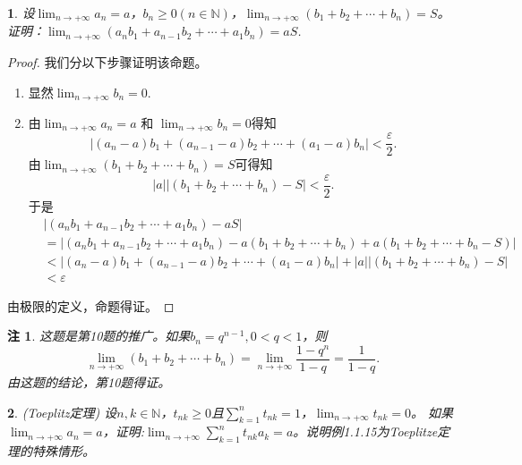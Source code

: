 \documentclass[utf8]{book}
\newtheorem{example}{}[section]             %
\newtheorem{remark}{注}
\begin{document}
\begin{example}
设$\displaystyle \lim_{n\to +\infty}a_n = a$，$b_n \geq 0 (n\in\mathbb{N})$，$\displaystyle \lim_{n\to +\infty}(b_1+b_2+\cdots+b_n) = S$。证明：$\displaystyle \lim_{n\to +\infty}(a_nb_1+a_{n-1}b_2+\cdots+a_1b_n) = aS$.
\end{example}
\begin{proof}
我们分以下步骤证明该命题。
\begin{enumerate}
\renewcommand\labelenumi{\normalfont(\theenumi)}
\item 显然$\displaystyle \lim_{n\to +\infty}b_n = 0$.
\item 
由$\displaystyle \lim_{n\to +\infty}a_n = a$ 和 $\displaystyle \lim_{n\to +\infty}b_n = 0$得知
$$\left | (a_n-a)b_1+(a_{n-1}-a)b_2+\cdots+(a_1-a)b_n\right| < \frac{\varepsilon}{2}.$$
由$\displaystyle \lim_{n\to +\infty}(b_1+b_2+\cdots+b_n) = S$可得知
$$\left|a\right|\left|(b_1 + b_2+\cdots + b_n) -S\right| < \frac{\varepsilon}{2}.$$
于是
\begin{equation*}
\begin{split}
&\left | (a_nb_1+a_{n-1}b_2+\cdots+a_1b_n) - aS \right | \\
&= \left | (a_nb_1+a_{n-1}b_2+\cdots+a_1b_n) - a(b_1+b_2+\cdots+b_n)+a(b_1+b_2+\cdots+b_n -S)\right| \\
&< \left | (a_n-a)b_1+(a_{n-1}-a)b_2+\cdots+(a_1-a)b_n\right| + \left|a\right|\left|(b_1 + b_2+\cdots + b_n) -S\right|\\&<\varepsilon
\end{split}
\end{equation*}
\end{enumerate}
由极限的定义，命题得证。
\end{proof}
\begin{remark}
这题是第10题的推广。如果$b_n = q^{n-1}, 0 < q < 1$，则
$$\displaystyle \lim_{n\to +\infty}(b_1 + b_2 + \cdots + b_n) = \lim_{n\to +\infty}\frac{1-q^n}{1-q}=\frac{1}{1-q}.$$ 
由这题的结论，第10题得证。
\end{remark}
\begin{example}
(Toeplitz定理) 设$n,k\in\mathbb{N}$，$t_{nk} \geq 0$且$\displaystyle\sum_{k=1}^nt_{nk}=1$，$\displaystyle \lim_{n\to +\infty}t_{nk} = 0$。
如果$\displaystyle \lim_{n\to +\infty}a_n = a$，证明:$\displaystyle \lim_{n\to +\infty}\sum_{k=1}^nt_{nk}a_k = a$。说明例1.1.15为Toeplitze定理的特殊情形。
\end{example}
\end{document}
